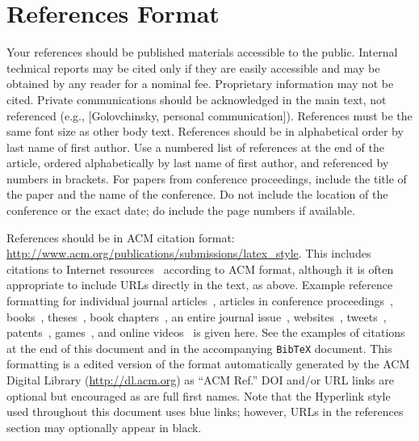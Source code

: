 \documentclass{sigchi}
\begin{document}
%
%
%
%
%
\balance{}

\section{References Format}
Your references should be published materials accessible to the
public. Internal technical reports may be cited only if they are
easily accessible and may be obtained by any reader for a nominal
fee. Proprietary information may not be cited. Private communications
should be acknowledged in the main text, not referenced (e.g.,
[Golovchinsky, personal communication]). References must be the same
font size as other body text. References should be in alphabetical
order by last name of first author. Use a numbered list of references
at the end of the article, ordered alphabetically by last name of
first author, and referenced by numbers in brackets. For papers from
conference proceedings, include the title of the paper and the name of
the conference. Do not include the location of the conference or the
exact date; do include the page numbers if available. 

References should be in ACM citation format:
\url{http://www.acm.org/publications/submissions/latex_style}.  This
includes citations to Internet
resources~\cite{CHINOSAUR:venue,cavender:writing,psy:gangnam}
according to ACM format, although it is often appropriate to include
URLs directly in the text, as above. Example reference formatting for
individual journal articles~\cite{ethics}, articles in conference
proceedings~\cite{Klemmer:2002:WSC:503376.503378},
books~\cite{Schwartz:1995:GBF}, theses~\cite{sutherland:sketchpad},
book chapters~\cite{winner:politics}, an entire journal
issue~\cite{kaye:puc},
websites~\cite{acm_categories,cavender:writing},
tweets~\cite{CHINOSAUR:venue}, patents~\cite{heilig:sensorama}, 
games~\cite{supermetroid:snes}, and
online videos~\cite{psy:gangnam} is given here.  See the examples of
citations at the end of this document and in the accompanying
\texttt{BibTeX} document. This formatting is a edited version of the
format automatically generated by the ACM Digital Library
(\url{http://dl.acm.org}) as ``ACM Ref.'' DOI and/or URL links are
optional but encouraged as are full first names. Note that the
Hyperlink style used throughout this document uses blue links;
however, URLs in the references section may optionally appear in
black.

\balance{}



\end{document}
